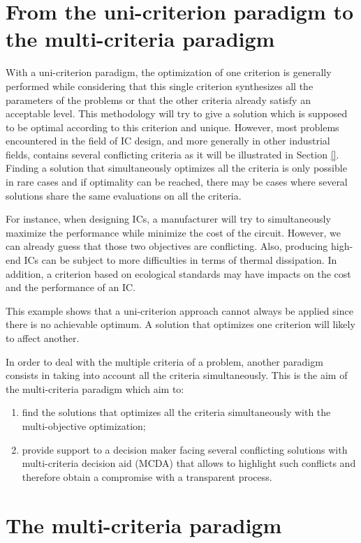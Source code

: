 \section{From the uni-criterion paradigm to the multi-criteria paradigm}
\label{sec:rol2.unicritmulticrit}

With a uni-criterion paradigm, the optimization of one criterion is generally performed while considering that this single criterion synthesizes all the parameters of the problems or that the other criteria already satisfy an acceptable level. This methodology will try to give a solution which is supposed to be optimal according to this criterion and unique. However, most problems encountered in the field of IC design, and more generally in other industrial fields, contains several conflicting criteria as it will be illustrated in Section \ref{}. Finding a solution that simultaneously optimizes all the criteria is only possible in rare cases and if optimality can be reached, there may be cases where several solutions share the same evaluations on all the criteria.

For instance, when designing ICs, a manufacturer will try to simultaneously maximize the performance while minimize the cost of the circuit. However, we can already guess that those two objectives are conflicting. Also, producing high-end ICs can be subject to more difficulties in terms of thermal dissipation. In addition, a criterion based on ecological standards may have impacts on the cost and the performance of an IC.

This example shows that a uni-criterion approach cannot always be applied since there is no achievable optimum. A solution that optimizes one criterion will likely to affect another.

In order to deal with the multiple criteria of a problem, another paradigm consists in taking into account all the criteria simultaneously. This is the aim of the multi-criteria paradigm which aim to:
\begin{enumerate}
\item find the solutions that optimizes all the criteria simultaneously with the multi-objective optimization;
\item provide support to a decision maker facing several conflicting solutions with multi-criteria decision aid (MCDA) that allows to highlight such conflicts and therefore obtain a compromise with a transparent process.
\end{enumerate}

\section{The multi-criteria paradigm}
\label{sec:rol2.multicrit_paradigm}

